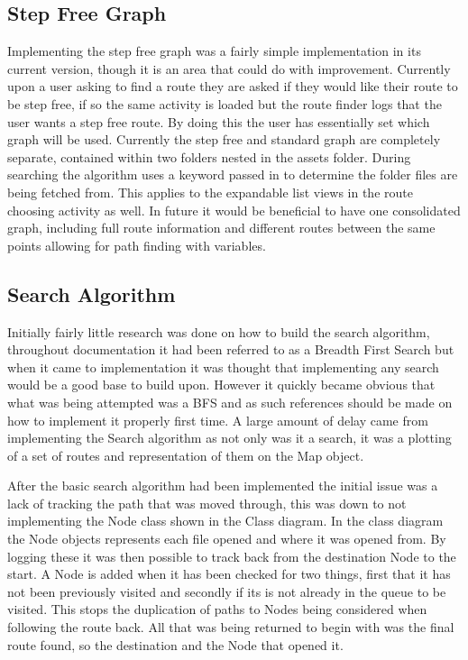 \subsection{Step Free Graph}
Implementing the step free graph was a fairly simple implementation in its current version, though it is an area that could do with improvement. Currently upon a user asking to find a route they are asked if they would like their route to be step free, if so the same activity is loaded but the route finder logs that the user wants a step free route. By doing this the user has essentially set which graph will be used. Currently the step free and standard graph are completely separate, contained within two folders nested in the assets folder. During searching the algorithm uses a keyword passed in to determine the folder files are being fetched from. This applies to the expandable list views in the route choosing activity as well. In future it would be beneficial to have one consolidated graph, including full route information and different routes between the same points allowing for path finding with variables.  
\newpage
\subsection{Search Algorithm}

Initially fairly little research was done on how to build the search algorithm, throughout documentation it had been referred to as a Breadth First Search but when it came to implementation it was thought that implementing any search would be a good base to build upon. However it quickly became obvious that what was being attempted was a BFS\cite{bfs} and as such references should be made on how to implement it properly first time. A large amount of delay came from implementing the Search algorithm as not only was it a search, it was a plotting of a set of routes and representation of them on the Map object. 

After the basic search algorithm had been implemented the initial issue was a lack of tracking the path that was moved through, this was down to not implementing the Node class shown in the Class diagram. In the class diagram the Node objects represents each file opened and where it was opened from. By logging these it was then possible to track back from the destination Node to the start. A Node is added when it has been checked for two things, first that it has not been previously visited and secondly if its is not already in the queue to be visited. This stops the duplication of paths to Nodes being considered when following the route back. All that was being returned to begin with was the final route found, so the destination and the Node that opened it.

